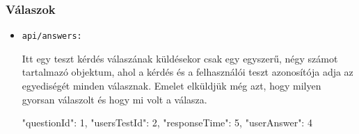 \subsubsection{Válaszok}
\begin{itemize}[label={$\bullet$}, topsep=0pt, itemsep=0pt, leftmargin=15pt]
    \item[] {\nolinkurl{api/answers:}}
          \begin{addmargin}[\parindent]{0pt}
              Itt egy teszt kérdés válaszának küldésekor csak egy egyszerű, négy számot tartalmazó objektum, ahol a kérdés és a felhasználói teszt azonosítója adja az egyediségét minden válasznak. Emelet elküldjük még azt, hogy milyen gyorsan válaszolt és hogy mi volt a válasza.

              \begin{json}
{
    "questionId": 1,
    "usersTestId": 2,
    "responseTime": 5,
    "userAnswer": 4
}
              \end{json}
          \end{addmargin}
\end{itemize}

